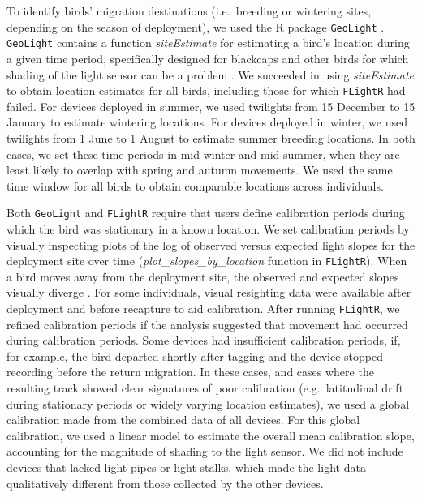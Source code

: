 \documentclass[a4paper, nobind]{templates/ociamthesis}
\begin{document}
To identify birds' migration destinations (i.e.~breeding or wintering sites, depending on the season of deployment), we used the R package \texttt{GeoLight} \autocite{lisovskiGeoLightProcessingAnalysing2012}. \texttt{GeoLight} contains a function \emph{siteEstimate} for estimating a bird's location during a given time period, specifically designed for blackcaps and other birds for which shading of the light sensor can be a problem \autocite{hiemerFirstTracksIndividual2018}. We succeeded in using \emph{siteEstimate} to obtain location estimates for all birds, including those for which \texttt{FLightR} had failed. For devices deployed in summer, we used twilights from 15 December to 15 January to estimate wintering locations. For devices deployed in winter, we used twilights from 1 June to 1 August to estimate summer breeding locations. In both cases, we set these time periods in mid-winter and mid-summer, when they are least likely to overlap with spring and autumn movements. We used the same time window for all birds to obtain comparable locations across individuals.

Both \texttt{GeoLight} and \texttt{FLightR} require that users define calibration periods during which the bird was stationary in a known location. We set calibration periods by visually inspecting plots of the log of observed versus expected light slopes for the deployment site over time (\emph{plot\_slopes\_by\_location} function in \texttt{FLightR}). When a bird moves away from the deployment site, the observed and expected slopes visually diverge \autocite{lisovskiLightlevelGeolocatorAnalyses2020}. For some individuals, visual resighting data were available after deployment and before recapture to aid calibration. After running \texttt{FLightR}, we refined calibration periods if the analysis suggested that movement had occurred during calibration periods. Some devices had insufficient calibration periods, if, for example, the bird departed shortly after tagging and the device stopped recording before the return migration. In these cases, and cases where the resulting track showed clear signatures of poor calibration (e.g.~latitudinal drift during stationary periods or widely varying location estimates), we used a global calibration made from the combined data of all devices. For this global calibration, we used a linear model to estimate the overall mean calibration slope, accounting for the magnitude of shading to the light sensor. We did not include devices that lacked light pipes or light stalks, which made the light data qualitatively different from those collected by the other devices.
\end{document}
